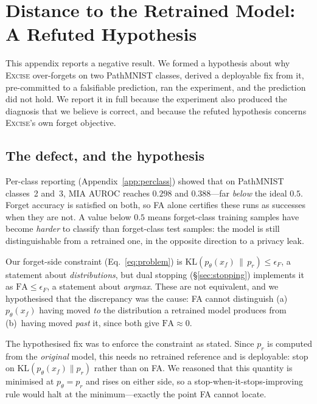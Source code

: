 \documentclass{article}
\newcommand{\ours}{\textsc{Excise}}
\newcommand{\KL}{\mathrm{KL}}
\theoremstyle{remark}
\theoremstyle{plain}
\begin{document}
\section{Distance to the Retrained Model: A Refuted Hypothesis}\label{app:d2r}

This appendix reports a negative result. We formed a hypothesis about why
\ours{} over-forgets on two PathMNIST classes, derived a deployable fix from it,
pre-committed to a falsifiable prediction, ran the experiment, and the
prediction did not hold. We report it in full because the experiment also
produced the diagnosis that we believe is correct, and because the refuted
hypothesis concerns \ours{}'s own forget objective.

\subsection{The defect, and the hypothesis}

Per-class reporting (Appendix~\ref{app:perclass}) showed that on PathMNIST
classes~2 and~3, MIA AUROC reaches $0.298$ and $0.388$---far \emph{below} the
ideal $0.5$. Forget accuracy is satisfied on both, so FA alone certifies these
runs as successes when they are not. A value below $0.5$ means forget-class
training samples have become \emph{harder} to classify than forget-class test
samples: the model is still distinguishable from a retrained one, in the
opposite direction to a privacy leak.

Our forget-side constraint (Eq.~\ref{eq:problem}) is
$\KL(p_\theta(x_f)\,\|\,p_r) \le \epsilon_F$, a statement about
\emph{distributions}, but dual stopping (\S\ref{sec:stopping}) implements it as
$\mathrm{FA} \le \epsilon_F$, a statement about \emph{argmax}. These are not
equivalent, and we hypothesised that the discrepancy was the cause: FA cannot
distinguish (a)~$p_\theta(x_f)$ having moved \emph{to} the distribution a
retrained model produces from (b)~having moved \emph{past} it, since both give
$\mathrm{FA}\approx 0$.

The hypothesised fix was to enforce the constraint as stated. Since $p_r$ is
computed from the \emph{original} model, this needs no retrained reference and
is deployable: stop on $\KL(p_\theta(x_f)\|p_r)$ rather than on FA. We reasoned
that this quantity is minimised at $p_\theta = p_r$ and rises on either side, so
a stop-when-it-stops-improving rule would halt at the minimum---exactly the
point FA cannot locate.
\end{document}
